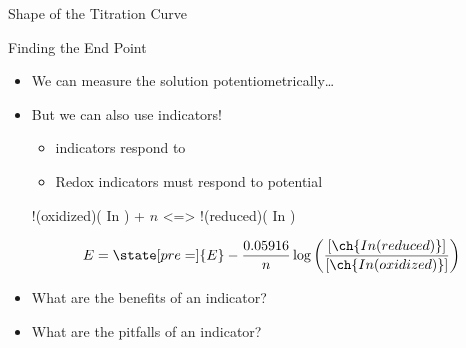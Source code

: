 \documentclass[notes=only]{beamer}
\begin{document}
\begin{frame}{Shape of the Titration Curve}
	\only<+>{}



\end{frame}

\begin{frame}{Finding the End Point}
	\begin{itemize}
		\item We can measure the solution potentiometrically\ldots

			\pause

		\item But we can also use indicators!
			\begin{itemize}
				\item \pH{} indicators respond to \pH{}
				\item Redox indicators must respond to potential
			\end{itemize}

			\begin{reaction*}
				!(oxidized)( In ) + $n$\el{} <=> !(reduced)( In
				)
			\end{reaction*}

			\begin{equation*}
				E = \state[pre=]{E} - \frac{0.05916}{n} \log
				\left( \frac{
					[\ch{In(reduced)}]}
					{[\ch{In(oxidized)}]} \right)
			\end{equation*}
		\item What are the benefits of an indicator?
		\item What are the pitfalls of an indicator?
	\end{itemize}
\end{frame}
\end{document}
